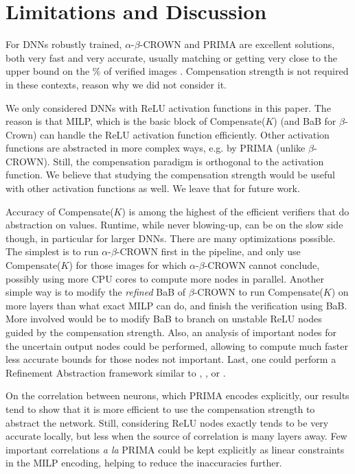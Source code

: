 \documentclass{llncs}
\begin{document}
\section{Limitations and Discussion}
\label{Discussion}

For DNNs robustly trained, $\alpha$-$\beta$-CROWN and PRIMA are excellent solutions, both very fast and very accurate, usually matching or getting very close \cite{crown} to the upper bound on the $\%$ of verified images \cite{attack}. Compensation strength is not required in these contexts, reason why we did not consider it.

We only considered DNNs with ReLU activation functions in this paper. The reason is that MILP, which is the basic block of Compensate($K$) (and BaB for $\beta$-Crown) can handle the ReLU activation function efficiently. Other activation functions are abstracted in more complex ways, e.g. by PRIMA (unlike $\beta$-CROWN). Still, the compensation paradigm is  orthogonal to the activation function. We believe that studying the compensation strength would be useful with other activation functions as well. We leave that for future work. 

Accuracy of Compensate($K$) is among the highest of the efficient verifiers that do abstraction on values. Runtime, while never blowing-up, can be on the slow side though, in particular for larger DNNs. There are many optimizations possible. The simplest is to run $\alpha$-$\beta$-CROWN first in the pipeline, and only use Compensate($K$) for those images for which $\alpha$-$\beta$-CROWN cannot conclude, possibly using more CPU cores to compute more nodes in parallel. Another simple way is to modify the {\em refined} BaB of $\beta$-CROWN to run Compensate($K$) on more layers than what exact MILP can do, and finish the verification using BaB. More involved would be to modify BaB to branch on unstable ReLU nodes guided by the compensation strength. Also, an analysis of important nodes for the uncertain output nodes could be performed, allowing to compute much faster less accurate bounds for those nodes not important. Last, one could perform a Refinement Abstraction framework similar to \cite{atva}, \cite{elboher}, or \cite{SRGR}.

On the correlation between neurons, which PRIMA encodes explicitly, our results tend to show that it is more efficient to use the compensation strength to abstract the network. Still, considering ReLU nodes exactly tends to be very accurate locally, but less when the source of correlation is many layers away. Few important correlations {\em a la} PRIMA could be kept explicitly as linear constraints in the MILP encoding, helping to reduce the inaccuracies further.
\end{document}
